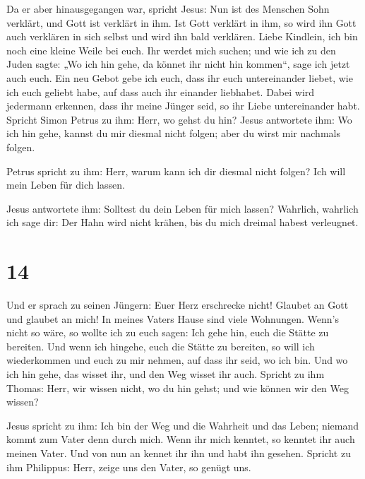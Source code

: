  Da er aber hinausgegangen war, spricht Jesus: Nun ist
des Menschen Sohn verklärt, und Gott ist verklärt in ihm.
 Ist Gott verklärt in ihm, so wird ihn Gott auch
verklären in sich selbst und wird ihn bald verklären. 
Liebe Kindlein, ich bin noch eine kleine Weile bei euch. Ihr werdet mich
suchen; und wie ich zu den Juden sagte: „Wo ich hin gehe, da könnet ihr
nicht hin kommen``, sage ich jetzt auch euch.  Ein neu
Gebot gebe ich euch, dass ihr euch untereinander liebet, wie ich euch
geliebt habe, auf dass auch ihr einander liebhabet. 
Dabei wird jedermann erkennen, dass ihr meine Jünger seid, so ihr Liebe
untereinander habt.  Spricht Simon Petrus zu ihm: Herr,
wo gehst du hin? Jesus antwortete ihm: Wo ich hin gehe, kannst du mir
diesmal nicht folgen; aber du wirst mir nachmals folgen.

 Petrus spricht zu ihm: Herr, warum kann ich dir diesmal
nicht folgen? Ich will mein Leben für dich lassen.

 Jesus antwortete ihm: Solltest du dein Leben für mich
lassen? Wahrlich, wahrlich ich sage dir: Der Hahn wird nicht krähen, bis
du mich dreimal habest verleugnet.

\hypertarget{section-13}{%
\section{14}\label{section-13}}

 Und er sprach zu seinen Jüngern: Euer Herz erschrecke
nicht! Glaubet an Gott und glaubet an mich!  In meines
Vaters Hause sind viele Wohnungen. Wenn's nicht so wäre, so wollte ich
zu euch sagen: Ich gehe hin, euch die Stätte zu bereiten. 
Und wenn ich hingehe, euch die Stätte zu bereiten, so will ich
wiederkommen und euch zu mir nehmen, auf dass ihr seid, wo ich bin.
 Und wo ich hin gehe, das wisset ihr, und den Weg wisset
ihr auch.  Spricht zu ihm Thomas: Herr, wir wissen nicht,
wo du hin gehst; und wie können wir den Weg wissen?

 Jesus spricht zu ihm: Ich bin der Weg und die Wahrheit
und das Leben; niemand kommt zum Vater denn durch mich. 
Wenn ihr mich kenntet, so kenntet ihr auch meinen Vater. Und von nun an
kennet ihr ihn und habt ihn gesehen.  Spricht zu ihm
Philippus: Herr, zeige uns den Vater, so genügt uns.

